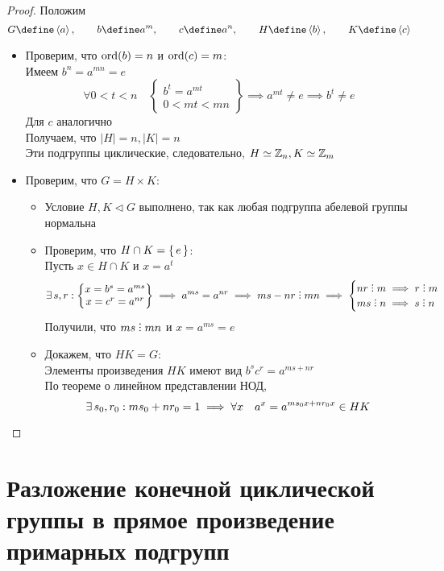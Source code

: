 \begin{proof}
	Положим
	$$ G \define \braket{a}, \qquad b \define a^m, \qquad c \define a^n, \qquad H \define \braket{b}, \qquad K \define \braket{c} $$
	\begin{itemize}
		\item Проверим, что $ \operatorname{ord}(b) = n $ и $ \operatorname{ord}(c) = m $: \\
		Имеем $ b^n = a^{mn} = e $
		$$ \forall 0 < t < n \quad
		\begin{Bmatrix}
			b^t = a^{mt} \\
			0 < mt < mn
		\end{Bmatrix} \implies a^{mt} \ne e \implies b^t \ne e $$
		Для $ c $ аналогично \\
		Получаем, что $ |H| = n, |K| = n $ \\
		Эти подгруппы циклические, следовательно, $ H \simeq \mathbb{Z}_n, K \simeq \mathbb{Z}_m $
		\item Проверим, что $ G = H \times K $:
		\begin{itemize}
			\item Условие $ H, K \vartriangleleft G $ выполнено, так как любая подгруппа абелевой группы нормальна
			\item Проверим, что $ H \cap K = \set{e} $: \\
			Пусть $ x \in H \cap K $ и $ x = a^t $
			$$ \exist s, r :
			\begin{Bmatrix}
				x = b^s = a^{ms} \\
				x = c^r = a^{nr}
			\end{Bmatrix} \implies a^{ms} = a^{nr} \implies ms - nr \divby mn \implies
			\begin{cases}
				nr \divby m \implies r \divby m \\
				ms \divby n \implies s \divby n
			\end{cases} $$
			Получили, что $ ms \divby mn $ и $ x = a^{ms} = e $
			\item Докажем, что $ HK = G $: \\
			Элементы произведения $ HK $ имеют вид $ b^sc^r = a^{ms + nr} $ \\
			По теореме о линейном представлении НОД,
			$$ \exists\, s_0, r_0 : ms_0 + nr_0 = 1 \implies \forall x \quad a^x = a^{ms_0x + nr_0x} \in HK $$
		\end{itemize}
	\end{itemize}
\end{proof}

\section{Разложение конечной циклической группы в прямое произведение примарных подгрупп}

